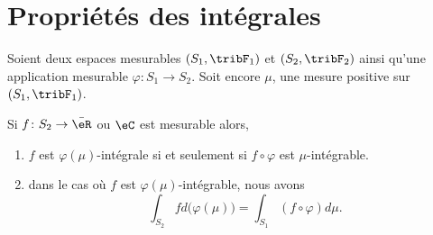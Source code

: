 \section{Propriétés des intégrales}

\begin{theorem}      \label{THOooVADUooLiRfGK}
    Soient deux espaces mesurables \( (S_1,\tribF_1)\) et \( (S_2,\tribF_2)\) ainsi qu'une application mesurable \( \varphi\colon S_1\to S_2\). Soit encore \( \mu\), une mesure positive sur \( (S_1,\tribF_1)\).

    Si \( f\colon S_2\to\bar \eR\) ou \( \eC\) est mesurable alors,
    \begin{enumerate}
        \item      \label{ItemooKMBIooZpHJSS}
            \( f\) est \( \varphi(\mu)\)-intégrale si et seulement si \( f\circ\varphi\) est \( \mu\)-intégrable.
        \item       \label{ItemooLAPYooUreDEl}
            dans le cas où \( f\) est \( \varphi(\mu)\)-intégrable, nous avons
            \begin{equation}        \label{EqooSOHXooXSbdoy}
                \int_{S_2}fd\big( \varphi(\mu) \big)=\int_{S_1}(f\circ\varphi)d\mu.
            \end{equation}
    \end{enumerate}
\end{theorem}

